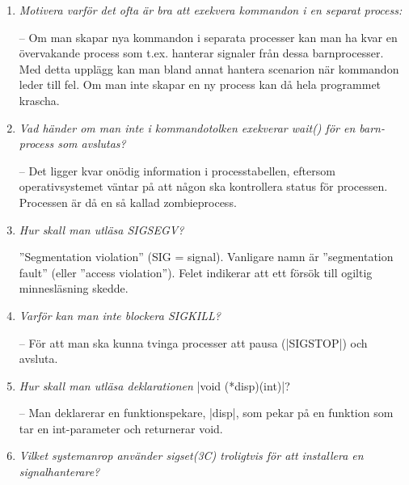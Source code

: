 \documentclass[paper=a4, fontsize=11pt]{scrartcl} %
\numberwithin{equation}{section} %
\numberwithin{figure}{section} %
\numberwithin{table}{section} %
\begin{document}
\begin{enumerate}[1)]

\item 
\emph{Motivera varför det ofta är bra att exekvera kommandon i en separat process:}

-- Om man skapar nya kommandon i separata processer kan man ha kvar en 
övervakande process som t.ex. hanterar signaler från dessa barnprocesser. 
Med detta upplägg kan man bland annat hantera scenarion när kommandon 
leder till fel. Om man inte skapar en ny process kan då hela programmet krascha.

\item
\emph{Vad händer om man inte i kommandotolken exekverar wait() för en 
barn-process som avslutas?}

-- Det ligger kvar onödig information i processtabellen, 
eftersom operativsystemet väntar på att någon ska kontrollera status för processen. 
Processen är då en så kallad zombieprocess.

\item
\emph{Hur skall man utläsa SIGSEGV?}

''Segmentation violation'' (SIG = signal). 
Vanligare namn är ''segmentation fault'' (eller ''access violation'').
Felet indikerar att ett försök till ogiltig minnesläsning skedde.

\item
\emph{Varför kan man inte blockera SIGKILL?} %

-- För att man ska kunna tvinga processer att pausa (|SIGSTOP|) och avsluta.



\item
\emph{Hur skall man utläsa deklarationen} |void (*disp)(int)|?

-- Man deklarerar en funktionspekare, |disp|, som pekar på en funktion som 
tar en int-parameter och returnerar void.

\item
\emph{Vilket systemanrop använder sigset(3C) troligtvis för att 
installera en signalhanterare?} %


\end{enumerate}
\end{document}
